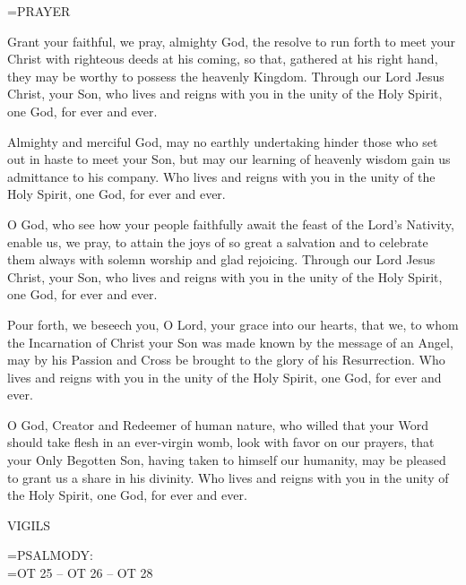 \hangindent=\parindent \small PRAYER
\begin{description}[labelindent=\parindent, leftmargin=*]
\item [Week 1:]    Grant your faithful, we pray, almighty God, the resolve to run forth to meet your Christ with righteous deeds at his coming, so that, gathered at his right hand, they may be worthy to possess the heavenly Kingdom. Through our Lord Jesus Christ, your Son, who lives and reigns with you in the unity of the Holy Spirit, one God, for ever and ever.
\item [Week 2:]    Almighty and merciful God, may no earthly undertaking hinder those who set out in haste to meet your Son, but may our learning of heavenly wisdom gain us admittance to his company. Who lives and reigns with you in the unity of the Holy Spirit, one God, for ever and ever.
\item [Week 3:]   O God, who see how your people faithfully await the feast of the Lord's Nativity, enable us, we pray, to attain the joys of so great a salvation and to celebrate them always with solemn worship and glad rejoicing. Through our Lord Jesus Christ, your Son, who lives and reigns with you in the unity of the Holy Spirit, one God, for ever and ever.
\item [Week 4:]    Pour forth, we beseech you, O Lord, your grace into our hearts, that we, to whom the Incarnation of Christ your Son was made known by the message of an Angel, may by his Passion and Cross be brought to the glory of his Resurrection. Who lives and reigns with you in the unity of the Holy Spirit, one God, for ever and ever.
\item [December 17th:]   O God, Creator and Redeemer of human nature, who willed that your Word should take flesh in an ever-virgin womb, look with favor on our prayers, that your Only Begotten Son, having taken to himself our humanity, may be pleased to grant us a share in his divinity. Who lives and reigns with you in the unity of the Holy Spirit, one God, for ever and ever.
\end{description}

\begin{flushleft}\normalsize VIGILS\\\end{flushleft}

\hangindent=\parindent \small{PSALMODY:}\\
\hangindent=\parindent  OT 25 -- OT 26 -- OT 28\vspace{0.5em}

